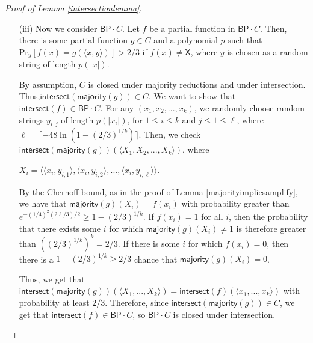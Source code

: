 \documentclass[11pt]{article}
\newcommand{\pr}{\text{Pr}}
\newcommand{\bp}{\textsf{BP}}
\newcommand{\x}{\textsf{X}}
\newcommand{\intersect}{\textsf{intersect}}
\newcommand{\majority}{\textsf{majority}}
\begin{document}
\begin{proof}[Proof of Lemma \ref{intersectionlemma}]
\begin{enumerate}
\item[(iii)] Now we consider $\bp \cdot C$. Let $f$ be a partial function in $\bp \cdot C$. Then, there is some partial function $g \in C$ and a polynomial $p$ such that $\pr_y[f(x) = g(\langle x,y\rangle)] > 2/3$ if $f(x) \ne \x$, where $y$ is chosen as a random string of length $p(|x|)$.

By assumption, $C$ is closed under majority reductions and under intersection. Thus,\linebreak $\intersect(\majority(g)) \in C$. We want to show that $\intersect(f) \in \bp\cdot C$. For any $(x_1,x_2,...,x_k)$, we randomly choose random strings $y_{i,j}$ of length $p(|x_i|)$, for $1\le i\le k$ and $j\le 1\le \ell$, where $\ell = \lceil -48\ln(1 - (2/3)^{1/k}) \rceil$. Then, we check $\intersect(\majority(g))(\langle X_1, X_2, ..., X_k\rangle)$, where
\begin{center}
$X_i = \langle\langle x_i,y_{i,1}\rangle,\langle x_{i},y_{i,2}\rangle,...,\langle x_{i},y_{i,\ell}\rangle\rangle$.
\end{center}
By the Chernoff bound, as in the proof of Lemma \ref{majorityimpliesamplify}, we have that $\majority(g)(X_i) = f(x_i)$ with probability greater than $e^{-(1/4)^2 (2\ell/3)/2} \ge 1 - (2/3)^{1/k}$. If $f(x_i) = 1$ for all $i$, then the probability that there exists some $i$ for which $\majority(g)(X_i) \ne 1$ is therefore greater than $((2/3)^{1/k})^k = 2/3$. If there is some $i$ for which $f(x_i) = 0$, then there is a $1 - (2/3)^{1/k} \ge 2/3$ chance that $\majority(g)(X_i) = 0$.

Thus, we get that $\intersect(\majority(g))(\langle X_1,...,X_k\rangle) = \intersect(f)(\langle x_1,...,x_k\rangle)$ with probability at least $2/3$. Therefore, since $\intersect(\majority(g)) \in C$, we get that $\intersect(f) \in \bp \cdot C$, so $\bp \cdot C$ is closed under intersection.



\end{enumerate}
\end{proof}
\end{document}
